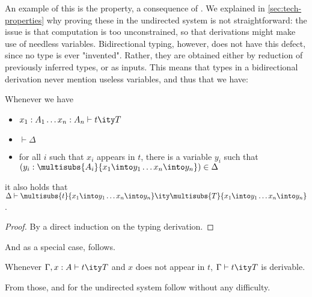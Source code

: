 An example of this is the  property, a consequence of
. We explained in \cref{sec:tech-properties}
why proving these in the undirected system is not straightforward: the issue is that 
computation is too unconstrained, so that derivations might make use of needless variables.
Bidirectional typing, however, does not have this defect, since no type is ever "invented".
Rather, they are obtained either by reduction of previously inferred types, or as inputs.
This means that types in a bidirectional derivation never mention useless variables, and thus
that we have:

\begin{theorem}
  \label{thm:strong-stab-renaming-bidir}
  Whenever we have 
  \begin{itemize}
    \item $\inferty{x_1 : A_1 \dots x_n : A_n}{t}{T}$
    \item $\vdash \Delta$
    \item for all $i$ such that $x_i$ appears in $t$,
      there is a variable $y_i$ such that $(y_i : \multisubs{A_i}{x_1 \into y_1 \dots x_n \into y_n}) \in \Delta$
  \end{itemize} 
  it also holds that $\inferty{\Delta}{\multisubs{t}{x_1 \into y_1 \dots x_n \into y_n}}{\multisubs{T}{x_1 \into y_1 \dots x_n \into y_n}}$.
\end{theorem}

\begin{proof}
  By a direct induction on the typing derivation.
\end{proof}

And as a special case,  follows.

\begin{theorem}
  \label{thm:strengthening-bidir}
  Whenever $\inferty{\Gamma, x : A}{t}{T}$ and $x$ does not appear in $t$,
  $\inferty{\Gamma}{t}{T}$ is derivable.
\end{theorem}

From those,  and  for
the undirected system follow without any difficulty.